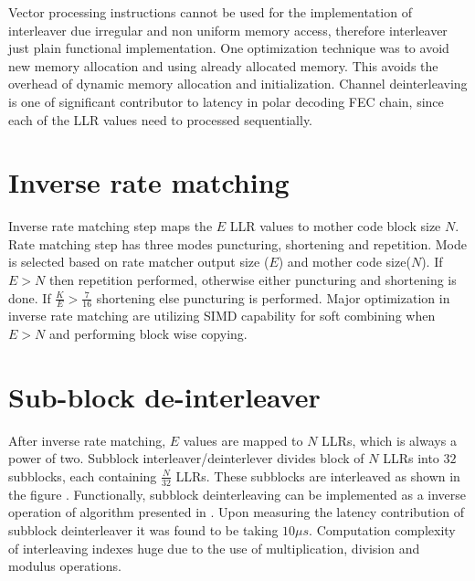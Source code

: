 Vector processing instructions cannot be used for the implementation of interleaver due irregular and non uniform memory access, therefore interleaver just plain functional implementation. One optimization technique was to avoid new memory allocation and using already allocated memory. This avoids the overhead of dynamic memory allocation and initialization. Channel deinterleaving is one of significant contributor to latency in polar decoding FEC chain, since each of the LLR values need to processed sequentially.

\section{Inverse rate matching}
Inverse rate matching step maps the $E$ LLR values to mother code block size $ N $. Rate matching step has three modes puncturing, shortening and repetition. Mode is selected based on rate matcher output size ($E$) and mother code size($ N $). If $E > N$ then repetition performed, otherwise either puncturing and shortening is done. If $ \frac{K}{E} > \frac{7}{16} $ shortening else puncturing is performed. Major optimization in inverse rate matching are utilizing SIMD capability for soft combining when $ E>N $ and performing block wise copying. 
%
%
\section{Sub-block de-interleaver}
After inverse rate matching, $E$ values are mapped to $N$ LLRs, which is always a power of two. Subblock interleaver/deinterlever divides block of $N$ LLRs into $32$ subblocks, each containing $\frac{N}{32}$ LLRs. These subblocks are interleaved as shown in the figure . Functionally, subblock deinterleaving can be implemented as a inverse operation of algorithm presented in \cite{3gpp.38.212}. Upon measuring the latency contribution of subblock deinterleaver it was found to be taking $10 \mu s$. Computation complexity of interleaving indexes huge due to the use of multiplication, division and modulus operations. \newline


